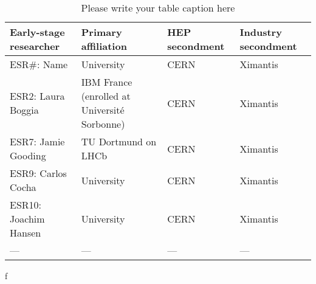 \begin{table}[h!]
    \centering
    \caption{Please write your table caption here}
    \label{esr-positions}       
    \begin{tabular}{llll}
    \hline
    Early-stage researcher & Primary affiliation & HEP secondment & Industry secondment \\\hline
    ESR\#: Name & University & CERN & Ximantis \\
    ESR2: Laura Boggia & IBM France (enrolled at Universit\'e Sorbonne) & CERN & Ximantis \\
    ESR7: Jamie Gooding & TU Dortmund on LHCb & CERN & Ximantis \\
    ESR9: Carlos Cocha & University & CERN & Ximantis \\
    ESR10: Joachim Hansen & University & CERN & Ximantis \\
    --- & --- & --- & --- \\\hline
    \end{tabular}
\end{table}

f